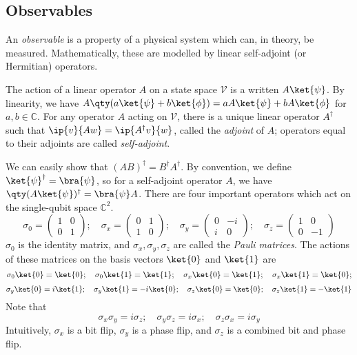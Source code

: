 \subsection{Observables}
An \emph{observable} is a property of a physical system which can, in theory, be measured.
Mathematically, these are modelled by linear self-adjoint (or Hermitian) operators.

The action of a linear operator \( A \) on a state space \( \mathcal V \) is a written \( A \ket{\psi} \).
By linearity, we have \( A \qty(a \ket{\psi} + b \ket{\phi}) = a A \ket{\psi} + b A \ket{\phi} \) for \( a, b \in \mathbb C \).
For any operator \( A \) acting on \( \mathcal V \), there is a unique linear operator \( A^\dagger \) such that \( \ip{v}{Aw} = \ip{A^\dagger v}{w} \), called the \emph{adjoint} of \( A \); operators equal to their adjoints are called \emph{self-adjoint}.

We can easily show that \( (AB)^\dagger = B^\dagger A^\dagger \).
By convention, we define \( \ket{\psi}^\dagger = \bra{\psi} \), so for a self-adjoint operator \( A \), we have \( \qty(A \ket{\psi})^\dagger = \bra{\psi} A \).
There are four important operators which act on the single-qubit space \( \mathbb C^2 \).
\[ \sigma_0 = \begin{pmatrix}
    1 & 0 \\
    0 & 1
\end{pmatrix};\quad \sigma_x = \begin{pmatrix}
    0 & 1 \\
    1 & 0
\end{pmatrix};\quad \sigma_y = \begin{pmatrix}
    0 & -i \\
    i & 0
\end{pmatrix};\quad \sigma_z = \begin{pmatrix}
    1 & 0 \\
    0 & -1
\end{pmatrix} \]
\( \sigma_0 \) is the identity matrix, and \( \sigma_x, \sigma_y, \sigma_z \) are called the \emph{Pauli matrices}.
The actions of these matrices on the basis vectors \( \ket{0} \) and \( \ket{1} \) are
\[ \sigma_0\ket{0} = \ket{0};\quad \sigma_0\ket{1} = \ket{1};\quad \sigma_x\ket{0} = \ket{1};\quad \sigma_x\ket{1} = \ket{0}; \]
\[ \sigma_y\ket{0} = i\ket{1};\quad \sigma_y\ket{1} = -i\ket{0};\quad \sigma_z\ket{0} = \ket{0};\quad \sigma_z\ket{1} = -\ket{1} \]
Note that
\[ \sigma_x \sigma_y = i \sigma_z;\quad \sigma_y \sigma_z = i \sigma_x;\quad \sigma_z \sigma_x = i\sigma_y \]
Intuitively, \( \sigma_x \) is a bit flip, \( \sigma_y \) is a phase flip, and \( \sigma_z \) is a combined bit and phase flip.

